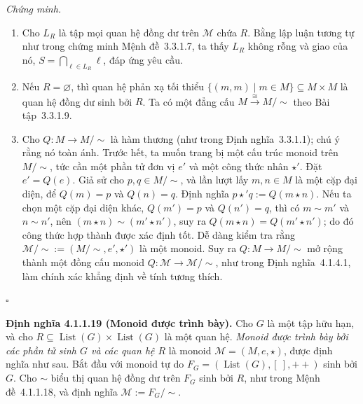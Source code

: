\noindent\textit{Chứng minh.}
\begin{enumerate}
\item Cho $L_R$ là tập mọi quan hệ đồng dư trên $\mathcal{M}$ chứa $R$. Bằng lập luận tương tự như trong chứng minh Mệnh đề~3.3.1.7, ta thấy $L_R$ không rỗng và giao của nó, $S=\bigcap_{\ell\in L_R}\ell$, đáp ứng yêu cầu.
\item Nếu $R=\varnothing$, thì quan hệ phản xạ tối thiểu $\{(m,m)\mid m\in M\}\subseteq M\times M$ là quan hệ đồng dư sinh bởi $R$. Ta có một đẳng cấu $M\xrightarrow{\cong}M/{\sim}$ theo Bài tập~3.3.1.9.
\item Cho $Q:M\to M/{\sim}$ là hàm thương (như trong Định nghĩa~3.3.1.1); chú ý rằng nó toàn ánh. Trước hết, ta muốn trang bị một cấu trúc monoid trên $M/{\sim}$, tức cần một phần tử đơn vị $e'$ và một công thức nhân $\star'$. Đặt $e'=Q(e)$. Giả sử cho $p,q\in M/{\sim}$, và lần lượt lấy $m,n\in M$ là một cặp đại diện, để $Q(m)=p$ và $Q(n)=q$. Định nghĩa $p\star' q:=Q(m\star n)$. Nếu ta chọn một cặp đại diện khác, $Q(m')=p$ và $Q(n')=q$, thì có $m\sim m'$ và $n\sim n'$, nên $(m\star n)\sim(m'\star n')$, suy ra $Q(m\star n)=Q(m'\star n')$; do đó công thức hợp thành được xác định tốt. Dễ dàng kiểm tra rằng $\mathcal{M}/{\sim}:=(M/{\sim},e',\star')$ là một monoid. Suy ra $Q:M\to M/{\sim}$ mở rộng thành một đồng cấu monoid $Q:\mathcal{M}\to\mathcal{M}/{\sim}$, như trong Định nghĩa~4.1.4.1, làm chính xác khẳng định về tính tương thích.
\end{enumerate}
\hfill$\square$

\noindent\textbf{Định nghĩa 4.1.1.19 (Monoid được trình bày).} Cho $G$ là một tập hữu hạn, và cho $R\subseteq\operatorname{List}(G)\times\operatorname{List}(G)$ là một quan hệ. \emph{Monoid được trình bày bởi các phần tử sinh $G$ và các quan hệ $R$} là monoid $\mathcal{M}=(M,e,\star)$, được định nghĩa như sau. Bắt đầu với monoid tự do $F_G=(\operatorname{List}(G),[\ ],\mathbin{+\!+})$ sinh bởi $G$. Cho $\sim$ biểu thị quan hệ đồng dư trên $F_G$ sinh bởi $R$, như trong Mệnh đề~4.1.1.18, và định nghĩa $\mathcal{M}:=F_G/{\sim}$.

